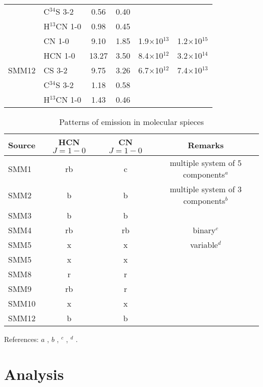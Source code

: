 \documentclass{aa}
\begin{document}
\begin{table*}
\begin{tabular}{l l c c c c}
{} & C$^{34}$S 3-2 & 0.56 & 0.40 &  & \\ 
{} & H$^{13}$CN 1-0 & 0.98 & 0.45 &  &\\ 
\hline
\multirow{5}{*}{SMM12} & CN 1-0 & 9.10 & 1.85 & 1.9$\times$10$^{13}$ & 1.2$\times$10$^{15}$\\
{} & HCN 1-0 & 13.27 & 3.50 & 8.4$\times$10$^{12}$ & 3.2$\times$10$^{14}$\\ 
{} & CS 3-2 & 9.75 & 3.26 & 6.7$\times$10$^{12}$ & 7.4$\times$10$^{13}$\\  
{} & C$^{34}$S 3-2 & 1.18 & 0.58 &  &\\ 
{} & H$^{13}$CN 1-0 & 1.43 & 0.46 & & \\ 
\hline
\end{tabular}
\end{table*}


\begin{table*}
\caption{Patterns of emission in molecular spieces}             %
\label{table:outflows}      %
\centering                          %
\begin{tabular}{l c c c} 
\hline\hline 
Source & HCN $J=1-0$ & CN $J=1-0$ & Remarks \\
\hline  
SMM1 & rb & c & multiple system of 5 components$^a$\\
SMM2 & b & b & multiple system of 3 components$^b$ \\ 
SMM3 & b & b & \\  
SMM4 & rb & rb & binary$^c$ \\ 
SMM5 & x & x & variable$^d$ \\ 
SMM5 & x & x & \\
SMM8 & r & r & \\
SMM9 & rb & r & \\ 
SMM10 & x & x & \\  
SMM12 & b & b & \\
\hline
\end{tabular}
\begin{flushleft}
References: $a$ \cite{Hul17}, $b$ \cite{Fra19}, $^c$ \cite{Aso18}, $^d$ \cite{Yoo17}.\\
\end{flushleft}
\end{table*}

\section{Analysis}
\end{document}
